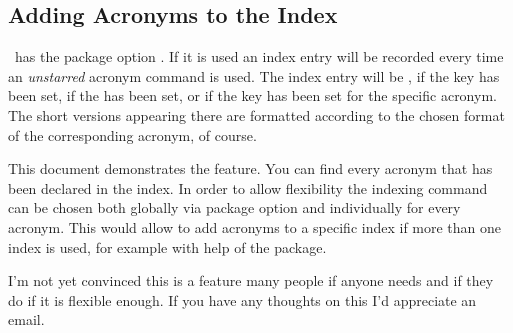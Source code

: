 \documentclass[load-preamble+]{cnltx-doc}
\begin{document}
\subsection{Adding Acronyms to the Index}\label{ssec:index}
\acro\ has the package option .  If it is used an index entry
will be recorded every time an \emph{unstarred} acronym command is used.  The
index entry will be ,
 if the  key has been set,
 if the  has been set,
or  if the key  has been set for the specific
acronym.  The short versions appearing there are formatted according to the
chosen format of the corresponding acronym, of course.

This document demonstrates the feature.  You can find every acronym that has
been declared in the index.  In order to allow flexibility the indexing
command can be chosen both globally via package option and individually for
every acronym.  This would allow to add acronyms to a specific index if more
than one index is used, for example with help of the  package.

I'm not yet convinced this is a feature many people if anyone needs and if
they do if it is flexible enough.  If you have any thoughts on this I'd
appreciate an email.
\end{document}
